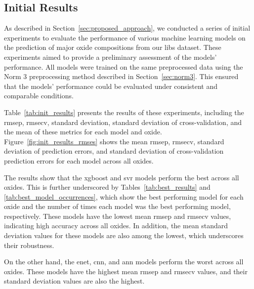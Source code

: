 \subsection{Initial Results}
As described in Section~\ref{sec:proposed_approach}, we conducted a series of initial experiments to evaluate the performance of various machine learning models on the prediction of major oxide compositions from our \gls{libs} dataset.
These experiments aimed to provide a preliminary assessment of the models' performance.
All models were trained on the same preprocessed data using the Norm 3 preprocessing method described in Section~\ref{sec:norm3}.
This ensured that the models' performance could be evaluated under consistent and comparable conditions.

Table~\ref{tab:init_results} presents the results of these experiments, including the \gls{rmsep}, \gls{rmsecv}, standard deviation, standard deviation of cross-validation, and the mean of these metrics for each model and oxide.
Figure~\ref{fig:init_results_rmses} shows the mean \gls{rmsep}, \gls{rmsecv}, standard deviation of prediction errors, and standard deviation of cross-validation prediction errors for each model across all oxides.

The results show that the \gls{xgboost} and \gls{svr} models perform the best across all oxides.
This is further underscored by Tables~\ref{tab:best_results} and \ref{tab:best_model_occurrences}, which show the best performing model for each oxide and the number of times each model was the best performing model, respectively.
These models have the lowest mean \gls{rmsep} and \gls{rmsecv} values, indicating high accuracy across all oxides.
In addition, the mean standard deviation values for these models are also among the lowest, which underscores their robustness.

On the other hand, the \gls{enet}, \gls{cnn}, and \gls{ann} models perform the worst across all oxides.
These models have the highest mean \gls{rmsep} and \gls{rmsecv} values, and their standard deviation values are also the highest.

